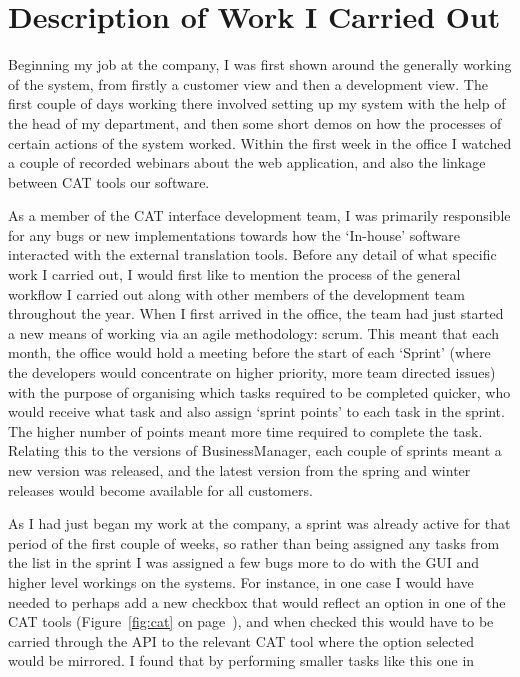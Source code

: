 \documentclass[12pt]{article}
\begin{document}
\section{Description of Work I Carried Out}
Beginning my job at the company, I was first shown around the generally working of the system, from firstly a customer
view and then a development view. The first couple of days working there involved setting up my system with the help of
the head of my department, and then some short demos on how the processes of certain actions of the system worked.
Within the first week in the office I watched a couple of recorded webinars about the web application, and also the
linkage between CAT tools our software.\\ \par \noindent
As a member of the CAT interface development team, I was primarily responsible for any bugs or new implementations
towards how the ‘In-house’ software interacted with the external translation tools. Before any detail of what specific
work I carried out, I would first like to mention the process of the general workflow I carried out along with other
members of the development team throughout the year. When I first arrived in the office, the team had just started a new
means of working via an agile methodology: scrum. This meant that each month, the office would hold a meeting before the
start of each ‘Sprint’ (where the developers would concentrate on higher priority, more team directed issues) with the
purpose of organising which tasks required to be completed quicker, who would receive what task and also assign ‘sprint
points’ to each task in the sprint. The higher number of points meant more time required to complete the task.
Relating this to the versions of BusinessManager, each couple of sprints meant a new version was released, and the latest 
version from the spring and winter releases would become available for all customers.\\ \par \noindent
As I had just began my work at the company, a sprint was already active for that period of the first couple of weeks, so
rather than being assigned any tasks from the list in the sprint I was assigned a few bugs more to do with the GUI and
higher level workings on the systems. For instance, in one case I would have needed to perhaps add a new checkbox that
would reflect an option in one of the CAT tools (Figure~\ref{fig:cat} on page~\pageref{fig:cat}), and when checked this would have to be carried through the API to the
relevant CAT tool where the option selected would be mirrored. I found that by performing smaller tasks like this one in
\end{document}
